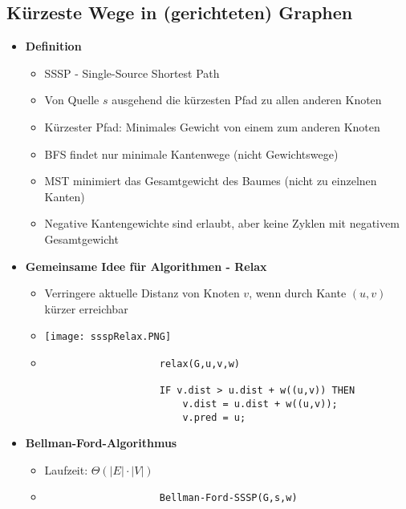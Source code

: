 \subsection{Kürzeste Wege in (gerichteten) Graphen}
    \begin{itemize}
        \item \textbf{Definition}
            \begin{itemize}
                \item SSSP - Single-Source Shortest Path
                \item Von Quelle $s$ ausgehend die kürzesten Pfad zu allen anderen Knoten
                \item Kürzester Pfad: Minimales Gewicht von einem zum anderen Knoten
                \item BFS findet nur minimale Kantenwege (nicht Gewichtswege)
                \item MST minimiert das Gesamtgewicht des Baumes (nicht zu einzelnen Kanten)
                \item Negative Kantengewichte sind erlaubt, aber keine Zyklen mit negativem Gesamtgewicht
            \end{itemize}
        
        \item \textbf{Gemeinsame Idee für Algorithmen - Relax}
            \begin{itemize}
                \item Verringere aktuelle Distanz von Knoten $v$, wenn durch Kante $(u,v)$ kürzer erreichbar
                \item[] \texttt{[image: ssspRelax.PNG]}
                \item[]
                    \begin{verbatim}
                    relax(G,u,v,w)

                    IF v.dist > u.dist + w((u,v)) THEN
                        v.dist = u.dist + w((u,v));
                        v.pred = u;
                    \end{verbatim}
            \end{itemize}

        \item \textbf{Bellman-Ford-Algorithmus}
            \begin{itemize}
                \item Laufzeit: $\Theta(|E| \cdot |V|)$
                \item[]
                    \begin{verbatim}
                    Bellman-Ford-SSSP(G,s,w)


\end{verbatim}
\end{itemize}
\end{itemize}
